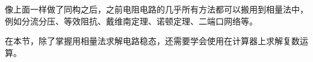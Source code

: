 \documentclass[UTF8]{report}
\theoremstyle{MyLineTheoremStyle} %
\theoremstyle{MyBlockTheoremStyle} %
\theoremstyle{MySubsubsectionStyle} %
\begin{document}
像上面一样做了同构之后，之前电阻电路的几乎所有方法都可以搬用到相量法中，例如分流分压、等效阻抗、戴维南定理、诺顿定理、二端口网络等。

在本节，除了掌握用相量法求解电路稳态，还需要学会使用在计算器上求解复数运算。
\end{document}
